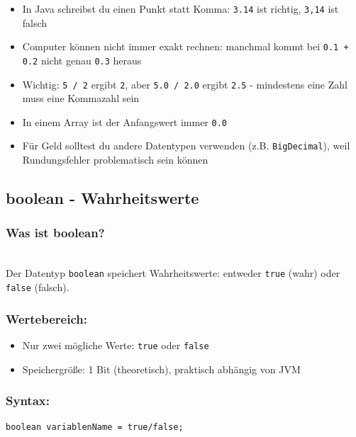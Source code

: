 \begin{achtung}
	\begin{itemize}
		\item In Java schreibst du einen Punkt statt Komma: \texttt{3.14} ist richtig, \texttt{3,14} ist falsch
		\item Computer können nicht immer exakt rechnen: manchmal kommt bei \texttt{0.1 + 0.2} nicht genau \texttt{0.3} heraus
		\item Wichtig: \texttt{5 / 2} ergibt \texttt{2}, aber \texttt{5.0 / 2.0} ergibt \texttt{2.5} - mindestens eine Zahl muss eine Kommazahl sein
		\item In einem Array ist der Anfangswert immer \texttt{0.0}
		\item Für Geld solltest du andere Datentypen verwenden (z.B. \texttt{BigDecimal}), weil Rundungsfehler problematisch sein können
	\end{itemize}
\end{achtung}

\newpage


\subsection*{boolean - Wahrheitswerte}

\subsubsection*{Was ist boolean?}\\
Der Datentyp \texttt{boolean} speichert Wahrheitswerte: entweder \texttt{true} (wahr) oder \texttt{false} (falsch).

\subsubsection*{Wertebereich:}
\begin{itemize}
	\item Nur zwei mögliche Werte: \texttt{true} oder \texttt{false}
	\item Speichergröße: 1 Bit (theoretisch), praktisch abhängig von JVM
\end{itemize}

\subsubsection*{Syntax:}
\begin{lstlisting}
boolean variablenName = true/false;
\end{lstlisting}

